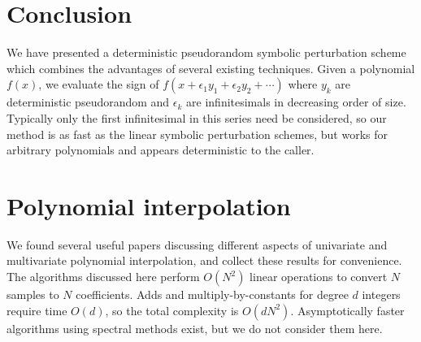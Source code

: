 \documentclass[11pt]{article}
\begin{document}
\section{Conclusion}

We have presented a deterministic pseudorandom symbolic perturbation scheme which combines the advantages of several existing techniques.  Given a polynomial $f(x)$, we evaluate
the sign of $f(x + \epsilon_1 y_1 + \epsilon_2 y_2 + \cdots)$ where $y_k$ are deterministic pseudorandom and $\epsilon_k$ are infinitesimals in decreasing order of size.
Typically only the first infinitesimal in this series need be considered, so our method is as fast as the linear symbolic perturbation schemes, but works for arbitrary
polynomials and appears deterministic to the caller.



\appendix

\section{Polynomial interpolation} \label{polynomial}

We found several useful papers discussing different aspects of univariate and multivariate polynomial interpolation, and collect these results for convenience.  The algorithms
discussed here perform $O(N^2)$ linear operations to convert $N$ samples to $N$ coefficients.  Adds and multiply-by-constants for degree $d$ integers require time $O(d)$, so
the total complexity is $O(d N^2)$.  Asymptotically faster algorithms using spectral methods exist, but we do not consider them here.
\end{document}
